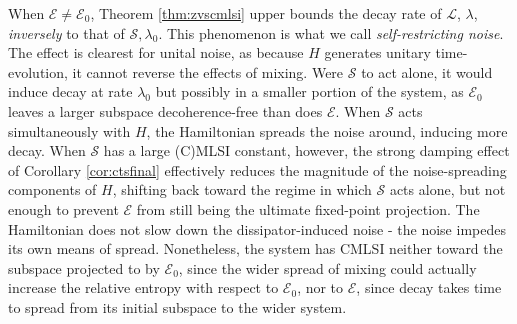 \documentclass[accepted=2026-02-01, letterpaper]{quantumarticle}
\newcommand{\E}{\mathcal{E}}
\renewcommand{\S}{\mathcal{S}}
\renewcommand{\L}{\mathcal{L}}
\newcommand{\Ha}{H}
\begin{document}
When $\E \neq \E_0$, Theorem \ref{thm:zvscmlsi} upper bounds the decay rate of $\L$, $\lambda$, \textit{inversely} to that of $\S, \lambda_0$. This phenomenon is what we call \textit{self-restricting noise}. The effect is clearest for unital noise, as because $\Ha$ generates unitary time-evolution, it cannot reverse the effects of mixing. Were $\S$ to act alone, it would induce decay at rate $\lambda_0$ but possibly in a smaller portion of the system, as $\E_0$ leaves a larger subspace decoherence-free than does $\E$. When $\S$ acts simultaneously with $\Ha$, the Hamiltonian spreads the noise around, inducing more decay. When $\S$ has a large (C)MLSI constant, however, the strong damping effect of Corollary \ref{cor:ctsfinal} effectively reduces the magnitude of the noise-spreading components of $\Ha$, shifting back toward the regime in which $\S$ acts alone, but not enough to prevent $\E$ from still being the ultimate fixed-point projection. The Hamiltonian does not slow down the dissipator-induced noise - the noise impedes its own means of spread. Nonetheless, the system has CMLSI neither toward the subspace projected to by $\E_0$, since the wider spread of mixing could actually increase the relative entropy with respect to $\E_0$, nor to $\E$, since decay takes time to spread from its initial subspace to the wider system.
\end{document}
